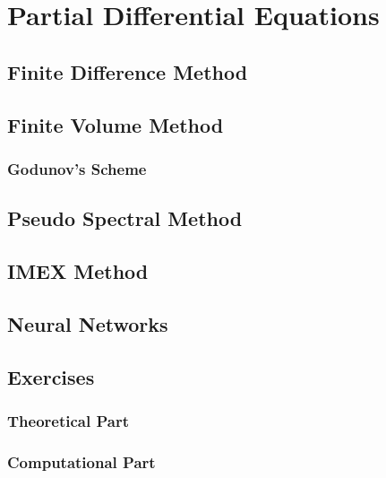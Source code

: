 \chapter{Partial Differential Equations}

\section{Finite Difference Method}


\section{Finite Volume Method}
\subsection{Godunov's Scheme}
\section{Pseudo Spectral Method}

\section{IMEX Method}


\section{Neural Networks}

\section{Exercises}
\subsection{Theoretical Part}
\subsection{Computational Part}